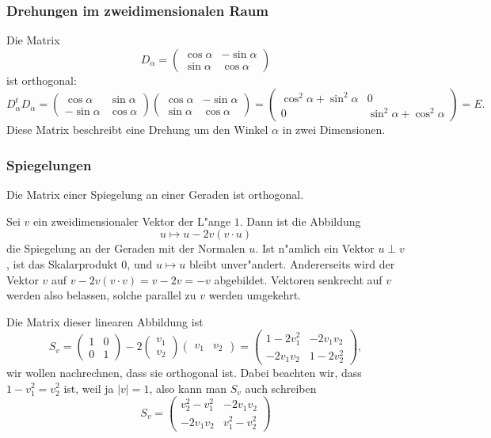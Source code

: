 \subsubsection{Drehungen im zweidimensionalen Raum}
Die Matrix
\[
D_\alpha
=
\begin{pmatrix}
\cos\alpha&-\sin\alpha\\
\sin\alpha& \cos\alpha
\end{pmatrix}
\]
ist orthogonal:
\[
D_\alpha^tD_\alpha
=
\begin{pmatrix}
 \cos\alpha&\sin\alpha\\
-\sin\alpha&\cos\alpha
\end{pmatrix}
\begin{pmatrix}
\cos\alpha&-\sin\alpha\\
\sin\alpha& \cos\alpha
\end{pmatrix}
=
\begin{pmatrix}
\cos^2\alpha+\sin^2\alpha&0\\
0&\sin^2\alpha+\cos^2\alpha
\end{pmatrix}
=E.
\]
Diese Matrix beschreibt eine Drehung um den Winkel $\alpha$
in zwei Dimensionen.

\subsubsection{Spiegelungen}
Die Matrix einer Spiegelung an einer Geraden ist orthogonal.

\smallskip

{\parindent 0pt
Sei} $v$ ein zweidimensionaler Vektor der L"ange $1$.
Dann ist die Abbildung 
\[
u\mapsto u-2v(v\cdot u)
\]
die Spiegelung an der Geraden mit der Normalen $u$.
Ist n"amlich
ein Vektor $u\perp v$, ist das Skalarprodukt $0$, und $u\mapsto u$
bleibt unver"andert.
Andererseits wird der Vektor $v$ auf
$v-2v(v\cdot v)=v-2v=-v$ abgebildet.
Vektoren senkrecht auf $v$
werden also belassen, solche parallel zu $v$ werden umgekehrt.

Die Matrix dieser linearen Abbildung ist
\[
S_v=\begin{pmatrix}1&0\\0&1\end{pmatrix}
-
2\begin{pmatrix}v_1\\v_2\end{pmatrix}
\begin{pmatrix}v_1&v_2\end{pmatrix}
=
\begin{pmatrix}
1-2v_1^2&-2v_1v_2\\
-2v_1v_2&1-2v_2^2
\end{pmatrix},
\]
wir wollen nachrechnen, dass sie orthogonal ist.
Dabei beachten
wir, dass $1-v_1^2=v_2^2$ ist, weil ja $|v|=1$, also kann man $S_v$
auch schreiben
\[
S_v=\begin{pmatrix}
v_2^2-v_1^2&-2v_1v_2\\
-2v_1v_2&v_1^2-v_2^2
\end{pmatrix}
\]


